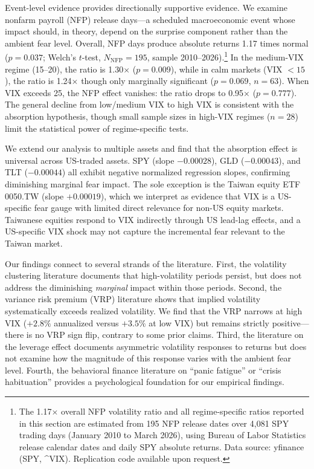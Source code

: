\documentclass[12pt,a4paper]{article}
\begin{document}
Event-level evidence provides directionally supportive evidence. We examine nonfarm payroll (NFP) release days---a scheduled macroeconomic event whose impact should, in theory, depend on the surprise component rather than the ambient fear level. Overall, NFP days produce absolute returns 1.17 times normal ($p = 0.037$; Welch's $t$-test, $N_{\text{NFP}} = 195$, sample 2010--2026).\footnote{The 1.17$\times$ overall NFP volatility ratio and all regime-specific ratios reported in this section are estimated from 195 NFP release dates over 4,081 SPY trading days (January 2010 to March 2026), using Bureau of Labor Statistics release calendar dates and daily SPY absolute returns. Data source: yfinance (SPY, \^{}VIX). Replication code available upon request.} In the medium-VIX regime (15--20), the ratio is 1.30$\times$ ($p = 0.009$), while in calm markets (VIX $< 15$), the ratio is 1.24$\times$ though only marginally significant ($p = 0.069$, $n = 63$). When VIX exceeds 25, the NFP effect vanishes: the ratio drops to 0.95$\times$ ($p = 0.777$). The general decline from low/medium VIX to high VIX is consistent with the absorption hypothesis, though small sample sizes in high-VIX regimes ($n = 28$) limit the statistical power of regime-specific tests.

We extend our analysis to multiple assets and find that the absorption effect is universal across US-traded assets. SPY (slope $-0.00028$), GLD ($-0.00043$), and TLT ($-0.00044$) all exhibit negative normalized regression slopes, confirming diminishing marginal fear impact. The sole exception is the Taiwan equity ETF 0050.TW (slope $+0.00019$), which we interpret as evidence that VIX is a US-specific fear gauge with limited direct relevance for non-US equity markets. Taiwanese equities respond to VIX indirectly through US lead-lag effects, and a US-specific VIX shock may not capture the incremental fear relevant to the Taiwan market.

Our findings connect to several strands of the literature. First, the volatility clustering literature \citep{engle1982, bollerslev1986} documents that high-volatility periods persist, but does not address the diminishing \textit{marginal} impact within those periods. Second, the variance risk premium (VRP) literature \citep{bollerslev2009, carr2009} shows that implied volatility systematically exceeds realized volatility. We find that the VRP narrows at high VIX ($+2.8\%$ annualized versus $+3.5\%$ at low VIX) but remains strictly positive---there is no VRP sign flip, contrary to some prior claims. Third, the literature on the leverage effect \citep{black1976, christie1982} documents asymmetric volatility responses to returns but does not examine how the magnitude of this response varies with the ambient fear level. Fourth, the behavioral finance literature on ``panic fatigue'' or ``crisis habituation'' \citep{kahneman1979, barberis2001} provides a psychological foundation for our empirical findings.
\end{document}
